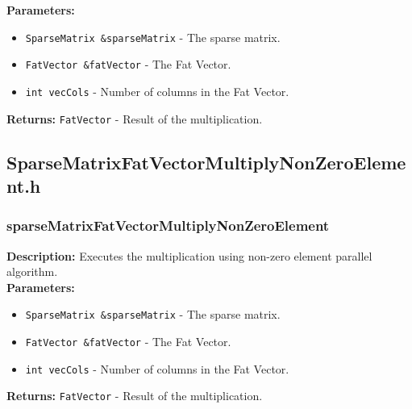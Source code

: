 \documentclass[12pt,oneside]{book} %
\begin{document}
\begin{subappendices}
    \textbf{Parameters:}
    \begin{itemize}
        \item \texttt{SparseMatrix \&sparseMatrix} - The sparse matrix.
        \item \texttt{FatVector \&fatVector} - The Fat Vector.
        \item \texttt{int vecCols} - Number of columns in the Fat Vector.
    \end{itemize}

    \textbf{Returns:} \texttt{FatVector} - Result of the multiplication.

    \subsection{SparseMatrixFatVectorMultiplyNonZeroElement.h}
    \subsubsection{sparseMatrixFatVectorMultiplyNonZeroElement}
    \textbf{Description:} Executes the multiplication using non-zero element parallel algorithm.\\

    \textbf{Parameters:}
    \begin{itemize}
        \item \texttt{SparseMatrix \&sparseMatrix} - The sparse matrix.
        \item \texttt{FatVector \&fatVector} - The Fat Vector.
        \item \texttt{int vecCols} - Number of columns in the Fat Vector.
    \end{itemize}

    \textbf{Returns:} \texttt{FatVector} - Result of the multiplication.

\end{subappendices}
\end{document}
